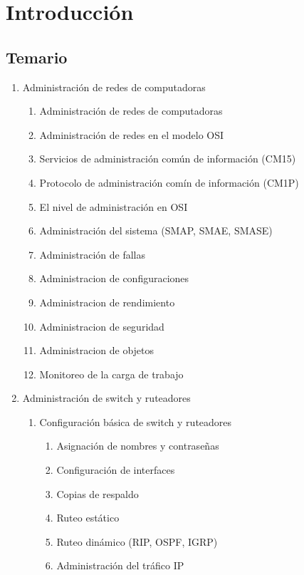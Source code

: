 \chapter{Introducción}
\section{Temario}
\begin{enumerate}
    \item {Administración de redes de computadoras
        \begin{enumerate}
        \item{Administración de redes de computadoras}
        \item{Administración de redes en el modelo OSI}
        \item{Servicios de administración común de información (CM15)}
        \item{Protocolo de administración comín de información (CM1P)}
        \item{El nivel de administración en OSI}
        \item{Administración del sistema (SMAP, SMAE, SMASE)}
        \item{Administración de fallas}
        \item{Administracion de configuraciones}
        \item{Administracion de rendimiento}
        \item{Administracion de seguridad}
        \item{Administracion de objetos}
        \item{Monitoreo de la carga de trabajo}
    \end{enumerate}
    }
    \item{ Administración de switch y ruteadores
        \begin{enumerate}
            \item{ Configuración básica de switch y ruteadores
                \begin{enumerate}
                    \item{Asignación de nombres y contraseñas}
                    \item{Configuración de interfaces}
                    \item{Copias de respaldo}
                    \item{Ruteo estático}
                    \item{Ruteo dinámico (RIP, OSPF, IGRP)}
                    \item{Administración del tráfico IP}

\end{enumerate}}
\end{enumerate}}
\end{enumerate}
